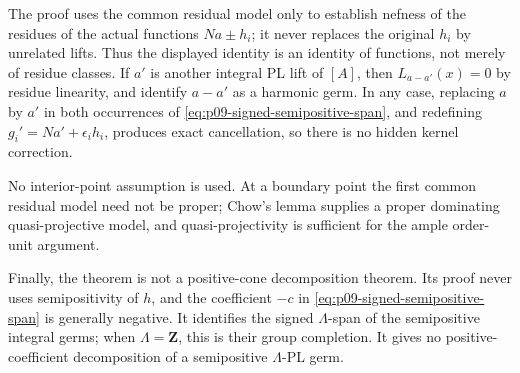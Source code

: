 \begin{remark}
\label{rem:p09-signed-semipositive-span-scope}
The proof uses the common residual model only to establish nefness of the
residues of the actual functions \(Na\pm h_i\); it never replaces the
original \(h_i\) by unrelated lifts.  Thus the displayed identity is an
identity of functions, not merely of residue classes.  If \(a'\) is another
integral PL lift of \([A]\), then \(L_{a-a'}(x)=0\) by residue linearity,
and \cite[Lemma~6.18 and Proposition~7.1]{GJR26} identify \(a-a'\) as a
harmonic germ.  In any case, replacing \(a\) by \(a'\) in both occurrences
of \eqref{eq:p09-signed-semipositive-span}, and redefining
\(g_i'=Na'+\epsilon_i h_i\), produces exact cancellation, so there is no
hidden kernel correction.

No interior-point assumption is used.  At a boundary point the first
common residual model need not be proper; Chow's lemma supplies a proper
dominating quasi-projective model, and quasi-projectivity is sufficient for
the ample order-unit argument.

Finally, the theorem is not a positive-cone decomposition theorem.  Its
proof never uses semipositivity of \(h\), and the coefficient \(-c\) in
\eqref{eq:p09-signed-semipositive-span} is generally negative.  It
identifies the signed \(\Lambda\)-span of the semipositive integral germs;
when \(\Lambda=\mathbf Z\), this is their group completion.  It gives no
positive-coefficient decomposition of a semipositive \(\Lambda\)-PL germ.
\end{remark}
